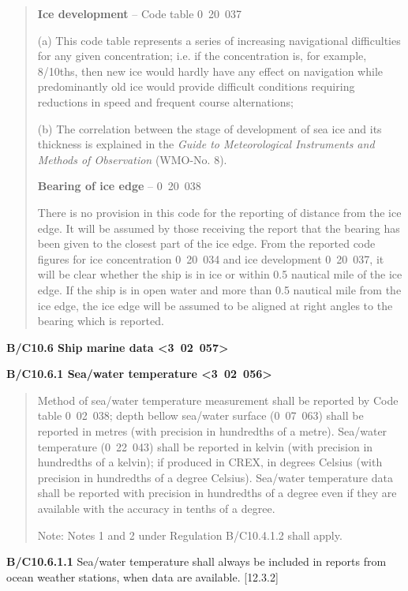 \begin{quote}
\textbf{Ice development} -- Code table 0~20~037

(a) This code table represents a series of increasing navigational difficulties for any given concentration; i.e. if the concentration is, for example, 8/10ths, then new ice would hardly have any effect on navigation while predominantly old ice would provide difficult conditions requiring reductions in speed and frequent course alternations;

(b) The correlation between the stage of development of sea ice and its thickness is explained in the \emph{Guide to Meteorological Instruments and Methods of Observation} (WMO-No. 8).

\textbf{Bearing of ice edge} -- 0~20~038

There is no provision in this code for the reporting of distance from the ice edge. It will be assumed by those receiving the report that the bearing has been given to the closest part of the ice edge. From the reported code figures for ice concentration 0~20~034 and ice development 0~20~037, it will be clear whether the ship is in ice or within 0.5 nautical mile of the ice edge. If the ship is in open water and more than 0.5 nautical mile from the ice edge, the ice edge will be assumed to be aligned at right angles to the bearing which is reported.
\end{quote}

\textbf{B/C10.6 Ship marine data \textless3~02~057\textgreater{}}

\textbf{B/C10.6.1 Sea/water temperature \textless3~02~056\textgreater{}}

\begin{quote}
Method of sea/water temperature measurement shall be reported by Code table 0~02~038; depth bellow sea/water surface (0~07~063) shall be reported in metres (with precision in hundredths of a metre). Sea/water temperature (0~22~043) shall be reported in kelvin (with precision in hundredths of a kelvin); if produced in CREX, in degrees Celsius (with precision in hundredths of a degree Celsius). Sea/water temperature data shall be reported with precision in hundredths of a degree even if they are available with the accuracy in tenths of a degree.

Note: Notes 1 and 2 under Regulation B/C10.4.1.2 shall apply.
\end{quote}

\textbf{B/C10.6.1.1} Sea/water temperature shall always be included in reports from ocean weather stations, when data are available. {[}12.3.2{]}

